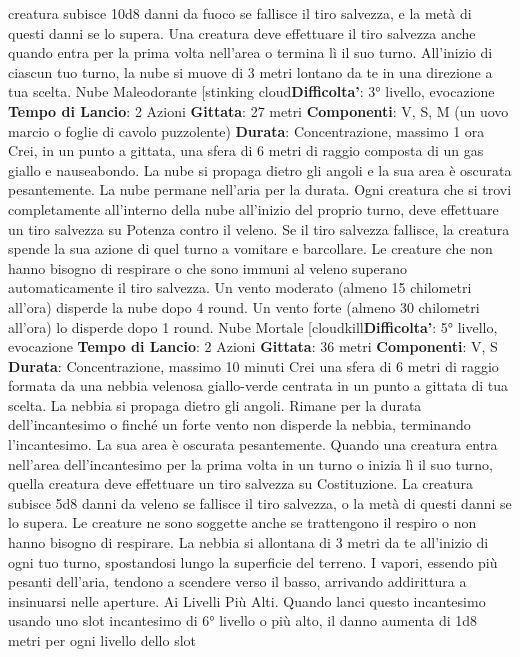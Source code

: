 \begin{multicols}{2}
creatura subisce 10d8 danni da fuoco se fallisce il tiro
salvezza, e la metà di questi danni se lo supera. Una
creatura deve effettuare il tiro salvezza anche quando
entra per la prima volta nell’area o termina lì il suo
turno.
All’inizio di ciascun tuo turno, la nube si muove di 3
metri lontano da te in una direzione a tua scelta.
Nube Maleodorante
[stinking cloud\textbf{Difficolta'}:
3° livello, evocazione
\textbf{Tempo di Lancio}: 2 Azioni
\textbf{Gittata}: 27 metri
\textbf{Componenti}: V, S, M (un uovo marcio o foglie di
cavolo puzzolente)
\textbf{Durata}: Concentrazione, massimo 1 ora
Crei, in un punto a gittata, una sfera di 6 metri di raggio
composta di un gas giallo e nauseabondo. La nube si
propaga dietro gli angoli e la sua area è oscurata
pesantemente. La nube permane nell’aria per la durata.
Ogni creatura che si trovi completamente all’interno
della nube all’inizio del proprio turno, deve effettuare un
tiro salvezza su Potenza contro il veleno. Se il tiro
salvezza fallisce, la creatura spende la sua azione di
quel turno a vomitare e barcollare. Le creature che non
hanno bisogno di respirare o che sono immuni al veleno
superano automaticamente il tiro salvezza.
Un vento moderato (almeno 15 chilometri all’ora)
disperde la nube dopo 4 round. Un vento forte (almeno
30 chilometri all’ora) lo disperde dopo 1 round.
Nube Mortale
[cloudkill\textbf{Difficolta'}:
5° livello, evocazione
\textbf{Tempo di Lancio}: 2 Azioni
\textbf{Gittata}: 36 metri
\textbf{Componenti}: V, S
\textbf{Durata}: Concentrazione, massimo 10 minuti
Crei una sfera di 6 metri di raggio formata da una
nebbia velenosa giallo-verde centrata in un punto a
gittata di tua scelta. La nebbia si propaga dietro gli
angoli. Rimane per la durata dell’incantesimo o finché
un forte vento non disperde la nebbia, terminando
l’incantesimo. La sua area è oscurata pesantemente.
Quando una creatura entra nell’area dell’incantesimo
per la prima volta in un turno o inizia lì il suo turno,
quella creatura deve effettuare un tiro salvezza su
Costituzione. La creatura subisce 5d8 danni da veleno
se fallisce il tiro salvezza, o la metà di questi danni se lo
supera. Le creature ne sono soggette anche se
trattengono il respiro o non hanno bisogno di respirare.
La nebbia si allontana di 3 metri da te all’inizio di ogni
tuo turno, spostandosi lungo la superficie del terreno. I
vapori, essendo più pesanti dell’aria, tendono a
scendere verso il basso, arrivando addirittura a
insinuarsi nelle aperture.
Ai Livelli Più Alti. Quando lanci questo incantesimo
usando uno slot incantesimo di 6° livello o più alto, il
danno aumenta di 1d8 metri per ogni livello dello slot

\end{multicols}
